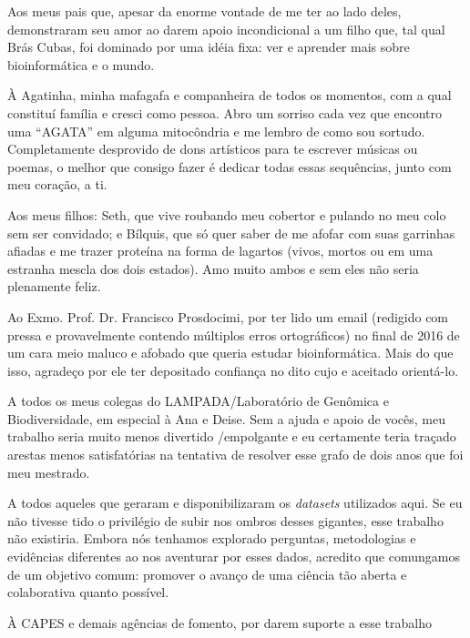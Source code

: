 \documentclass[
	12pt,				%
	oneside,
	a4paper,			%
	english,			%
	spanish,			%
	brazil				%
	]{abntex2}
\begin{document}

\begin{agradecimentos}
Aos meus pais que, apesar da enorme vontade de me ter ao lado deles, demonstraram seu amor ao darem apoio incondicional a um filho que, tal qual Brás Cubas, foi dominado por uma idéia fixa: ver e aprender mais sobre bioinformática e o mundo.

À Agatinha, minha mafagafa e companheira de todos os momentos, com a qual constituí família e cresci como pessoa. Abro um sorriso cada vez que encontro uma “AGATA” em alguma mitocôndria e me lembro de como sou sortudo. Completamente desprovido de dons artísticos para te escrever músicas ou poemas, o melhor que consigo fazer é dedicar todas essas sequências, junto com meu coração, a ti.

Aos meus filhos: Seth, que vive roubando meu cobertor e pulando no meu colo sem ser convidado; e Bílquis, que só quer saber de me afofar com suas garrinhas afiadas e me trazer proteína na forma de lagartos (vivos, mortos ou em uma estranha mescla dos dois estados). Amo muito ambos e sem eles não seria plenamente feliz.

Ao Exmo. Prof. Dr. Francisco Prosdocimi, por ter lido um email (redigido com pressa e provavelmente contendo múltiplos erros ortográficos) no final de 2016 de um cara meio maluco e afobado que queria estudar bioinformática. Mais do que isso, agradeço por ele ter depositado confiança no dito cujo e aceitado orientá-lo.

A todos os meus colegas do LAMPADA/Laboratório de Genômica e Biodiversidade, em especial à Ana e Deise. Sem a ajuda e apoio de vocês, meu trabalho seria muito menos divertido /empolgante e eu certamente teria traçado arestas menos satisfatórias na tentativa de resolver esse grafo de dois anos que foi meu mestrado.

A todos aqueles que geraram e disponibilizaram os \textit{datasets} utilizados aqui. Se eu não tivesse tido o privilégio de subir nos ombros desses gigantes, esse trabalho não existiria. Embora nós tenhamos explorado perguntas, metodologias e evidências diferentes ao nos aventurar por esses dados, acredito que comungamos de um objetivo comum: promover o avanço de uma ciência tão aberta e colaborativa quanto possível.

À CAPES e demais agências de fomento, por darem suporte a esse trabalho

\end{agradecimentos}
\end{document}
